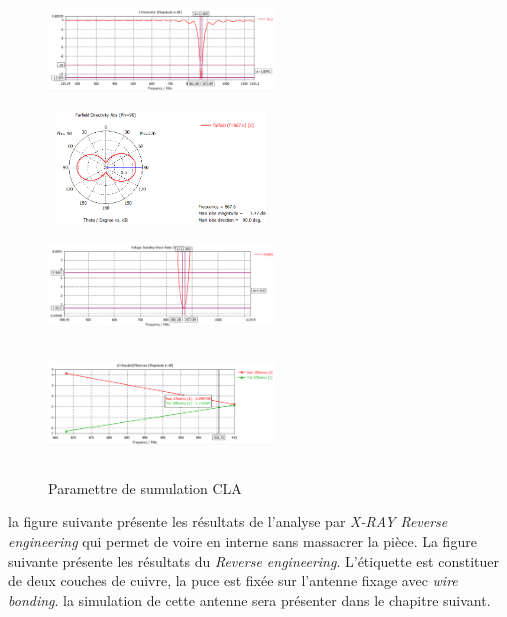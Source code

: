 \documentclass[11pt, a4paper, twoside]{book}
\begin{document}
\begin{figure}[H]
\centering
\includegraphics[width=6cm,height=3cm]{claaaass11}
\includegraphics[width=6cm,height=3cm]{claPattern}
\includegraphics[width=6cm,height=3cm]{claaavswr}
\includegraphics[width=6cm,height=3cm]{claefficency}
\caption{Paramettre de sumulation CLA}
\end{figure} 

la figure suivante présente les résultats de l'analyse par  \emph{X-RAY Reverse engineering} qui permet de voire en interne sans massacrer la pièce. La figure suivante présente les résultats du \emph{Reverse engineering}. L’étiquette est constituer de deux couches de cuivre, la puce est fixée sur l'antenne fixage avec \emph{wire bonding}. la simulation de cette antenne sera présenter dans le chapitre suivant. \\
\end{document}
